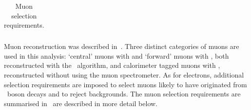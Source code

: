 \begin{table}[]
\begin{tabular}{ l  l l }
%
    \hline \hline
  \end{tabular}
   \caption{Muon selection requirements.}
   \label{table:objsel-mu}
\end{table}

Muon reconstruction was described in~. Three distinct categories of
muons are used in this analysis: `central' muons with  and
`forward' muons with , both reconstructed with the
\staco\ algorithm, and calorimeter tagged muons with ,
reconstructed without using the muon spectrometer. As for electrons, additional
selection requirements are imposed to select muons likely to have originated from
\Z\ boson decays and to reject backgrounds. The muon selection requirements are
summarised in~ are described in more detail below. 

